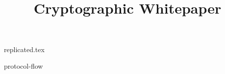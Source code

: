\documentclass{llncs}
\begin{document}
%

\title{Cryptographic Whitepaper}
\author{}

\maketitle


%
{replicated.tex}


\newpage
%



\clearpage
\appendix


{protocol-flow}
\end{document}
